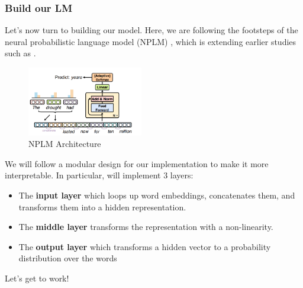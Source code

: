 \subsubsection{Build our LM}
Let's now turn to building our model.
Here, we are following the footsteps of the neural probabilistic language model (NPLM) \citep{sun2021revisiting}, which is extending earlier studies such as \citet{bengio2003a}.   

\begin{figure}[h]
    \centering
    \includegraphics[width=0.45\textwidth]{figures/nplm.png}
    \caption{NPLM Architecture}
\end{figure}

We will follow a modular design for our implementation to make it more interpretable.
In particular, will implement 3 layers:
\begin{itemize}
    \item The \textbf{input layer} which loops up word embeddings, concatenates them, and transforms them into a hidden representation.
    \item The \textbf{middle layer} transforms the representation with a non-linearity.
    \item The \textbf{output layer} which transforms a hidden vector to a probability distribution over the words
\end{itemize}
Let's get to work!\\

